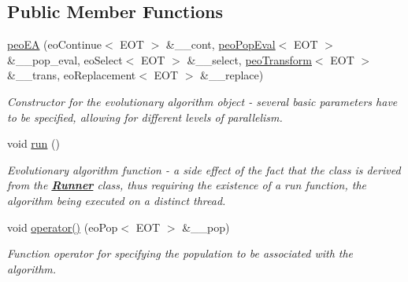 \subsection*{Public Member Functions}
\begin{CompactItemize}
\item 
\hyperlink{classpeoEA_dbfc4f8907bef234602149229f132371}{peo\-EA} (eo\-Continue$<$ EOT $>$ \&\_\-\_\-cont, \hyperlink{classpeoPopEval}{peo\-Pop\-Eval}$<$ EOT $>$ \&\_\-\_\-pop\_\-eval, eo\-Select$<$ EOT $>$ \&\_\-\_\-select, \hyperlink{classpeoTransform}{peo\-Transform}$<$ EOT $>$ \&\_\-\_\-trans, eo\-Replacement$<$ EOT $>$ \&\_\-\_\-replace)
\begin{CompactList}\small\item\em Constructor for the evolutionary algorithm object - several basic parameters have to be specified, allowing for different levels of parallelism. \item\end{CompactList}\item 
\hypertarget{classpeoEA_6ab8c321d29350634143a2a01cf2ad24}{
void \hyperlink{classpeoEA_6ab8c321d29350634143a2a01cf2ad24}{run} ()}
\label{classpeoEA_6ab8c321d29350634143a2a01cf2ad24}

\begin{CompactList}\small\item\em Evolutionary algorithm function - a side effect of the fact that the class is derived from the {\bf \hyperlink{classRunner}{Runner}} class, thus requiring the existence of a {\em run\/} function, the algorithm being executed on a distinct thread. \item\end{CompactList}\item 
void \hyperlink{classpeoEA_3c709e3b2491147d26fee36138644613}{operator()} (eo\-Pop$<$ EOT $>$ \&\_\-\_\-pop)
\begin{CompactList}\small\item\em Function operator for specifying the population to be associated with the algorithm. \item\end{CompactList}\end{CompactItemize}
